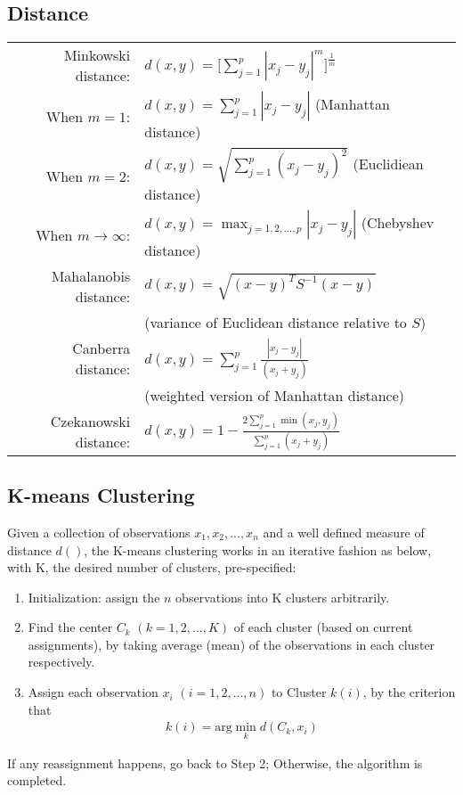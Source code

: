 \documentclass[12pt]{extarticle}
\newcommand{\<}{\langle}
\renewcommand{\>}{\rangle}
\theoremstyle{definition}
\begin{document}
\subsection{Distance}
\begin{tcolorbox}[enhanced, drop fuzzy shadow, title=Distance (No need to memorize)]
\renewcommand{\arraystretch}{2}
\begin{tabular}{rl}
Minkowski distance:& $d(x,y)=\Big[ \sum^p_{j=1} |x_j -y_j|^m \Big]^\frac{1}{m}$\\
When $m=1$:& $d(x,y)=\sum^p_{j=1} |x_j -y_j|$ (Manhattan distance)\\
When $m=2$:& $d(x,y)=\sqrt{\sum^p_{j=1} (x_j -y_j)^2}$ (Euclidiean distance)\\
When $m \rightarrow \infty$:& $d(x,y)= \max_{j=1,2,...,p} |x_j -y_j|$ (Chebyshev distance)\\
Mahalanobis distance:& $d(x,y)=\sqrt{(x-y)^T S^{-1} (x-y)}$\\
& (variance of Euclidean distance relative to $S$)\\
Canberra distance:& $d(x,y)=\sum^p_{j=1} \frac{|x_j -y_j|}{(x_j +y_j)}$\\
& (weighted version of Manhattan distance)\\
Czekanowski distance:& $d(x,y)=1-\frac{2\sum^p_{j=1}\min(x_j,y_j)}{\sum^p_{j=1}(x_j +y_j)}$
\end{tabular}
\end{tcolorbox}

\subsection{K-means Clustering}
\begin{tcolorbox}[enhanced, drop fuzzy shadow, title=K-means Clustering]
Given a collection of observations $x_1,x_2,...,x_n$ and a well defined measure of distance $d()$, the K-means clustering works in an iterative fashion as below, with K, the desired number of clusters, pre-specified:
\begin{enumerate}
    \item Initialization: assign the $n$ observations into K clusters arbitrarily.\\
    \item Find the center $C_k$ $(k=1,2,...,K)$ of each cluster (based on current assignments), by taking average (mean) of the observations in each cluster respectively.\\
    \item Assign each observation $x_i$ $(i=1,2,...,n)$ to Cluster $k(i)$, by the criterion that
    \begin{align*}
        k(i)=\text{arg}\min_k d(C_k, x_i)
    \end{align*}
\end{enumerate}
If any reassignment happens, go back to Step 2; Otherwise, the algorithm is completed.
\end{tcolorbox}
\end{document}
